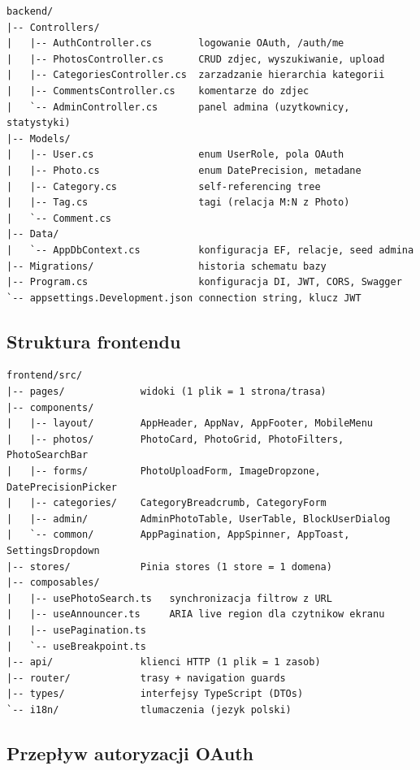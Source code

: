 \documentclass[12pt, a4paper]{article}
\begin{document}
\begin{lstlisting}[style=plain, caption={Drzewo katalogów backendu}]
backend/
|-- Controllers/
|   |-- AuthController.cs        logowanie OAuth, /auth/me
|   |-- PhotosController.cs      CRUD zdjec, wyszukiwanie, upload
|   |-- CategoriesController.cs  zarzadzanie hierarchia kategorii
|   |-- CommentsController.cs    komentarze do zdjec
|   `-- AdminController.cs       panel admina (uzytkownicy, statystyki)
|-- Models/
|   |-- User.cs                  enum UserRole, pola OAuth
|   |-- Photo.cs                 enum DatePrecision, metadane
|   |-- Category.cs              self-referencing tree
|   |-- Tag.cs                   tagi (relacja M:N z Photo)
|   `-- Comment.cs
|-- Data/
|   `-- AppDbContext.cs          konfiguracja EF, relacje, seed admina
|-- Migrations/                  historia schematu bazy
|-- Program.cs                   konfiguracja DI, JWT, CORS, Swagger
`-- appsettings.Development.json connection string, klucz JWT
\end{lstlisting}

\subsection{Struktura frontendu}

\begin{lstlisting}[style=plain, caption={Drzewo katalogów frontendu (src/)}]
frontend/src/
|-- pages/             widoki (1 plik = 1 strona/trasa)
|-- components/
|   |-- layout/        AppHeader, AppNav, AppFooter, MobileMenu
|   |-- photos/        PhotoCard, PhotoGrid, PhotoFilters, PhotoSearchBar
|   |-- forms/         PhotoUploadForm, ImageDropzone, DatePrecisionPicker
|   |-- categories/    CategoryBreadcrumb, CategoryForm
|   |-- admin/         AdminPhotoTable, UserTable, BlockUserDialog
|   `-- common/        AppPagination, AppSpinner, AppToast, SettingsDropdown
|-- stores/            Pinia stores (1 store = 1 domena)
|-- composables/
|   |-- usePhotoSearch.ts   synchronizacja filtrow z URL
|   |-- useAnnouncer.ts     ARIA live region dla czytnikow ekranu
|   |-- usePagination.ts
|   `-- useBreakpoint.ts
|-- api/               klienci HTTP (1 plik = 1 zasob)
|-- router/            trasy + navigation guards
|-- types/             interfejsy TypeScript (DTOs)
`-- i18n/              tlumaczenia (jezyk polski)
\end{lstlisting}

\subsection{Przepływ autoryzacji OAuth}
\end{document}
